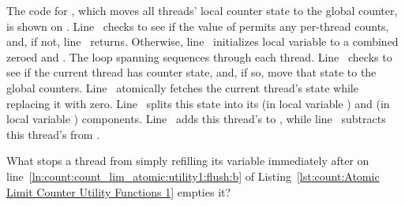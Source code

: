 \begin{lineref}
The code for , which moves all threads' local
counter state to the global counter, is shown on
.
Line~ checks to see if the value of
 permits
any per-thread counts, and, if not, line~ returns.
Otherwise, line~ initializes local variable  to a combined
zeroed  and .
The loop spanning  sequences
through each thread.
Line~ checks to see if the current thread has counter state,
and, if so,  move that state
to the global counters.
Line~ atomically fetches the current thread's state
while replacing it with zero.
Line~ splits this state into its 
(in local variable )
and  (in local variable ) components.
Line~ adds this thread's  to , while
line~ subtracts this thread's  from .
\end{lineref}

\QuickQuiz{}
	What stops a thread from simply refilling its
	 variable immediately after
	 on
        line~\ref{ln:count:count_lim_atomic:utility1:flush:b} of
	Listing~\ref{lst:count:Atomic Limit Counter Utility Functions 1}
	empties it?
 \QuickQuizEnd

